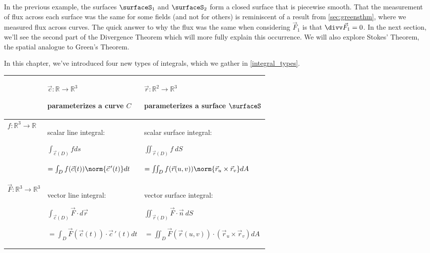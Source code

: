 In the previous example, the surfaces $\surfaceS_1$ and $\surfaceS_2$ form a closed surface that is piecewise smooth. That the measurement of flux across each surface was the same for some fields (and not for others) is reminiscent of a result from \autoref{sec:greensthm}, where we measured flux across curves. The quick answer to why the flux was the same when considering $\vec F_1$ is that $\divv \vec F_1 = 0$. In the next section, we'll see the second part of the Divergence Theorem which will more fully explain this occurrence. We will also explore Stokes' Theorem, the spatial analogue to Green's Theorem.\bigskip

In this chapter, we've introduced four new types of integrals, which we gather in \autoref{integral_types}.

\setboxwidth{80pt}
\begin{keyidea}\label{integral_types}
\renewcommand{\arraystretch}{1.4}
 \begin{tabular}{|l|p{.32\specialboxlength}|p{.43\specialboxlength}|}\hline
  & $\vec c:\mathbb{R}\to\mathbb{R}^3$\par parameterizes a curve $C$
  & $\vec r:\mathbb{R}^2\to\mathbb{R}^3$\par parameterizes a surface $\surfaceS$ \\\hline
  $f:\mathbb{R}^3\to\mathbb{R}$
  & scalar line integral:\par
  $\int_{\vec c(D)} f ds$\par
  \qquad$=\int_D f(\vec c(t))\norm{\vec c\,'(t)}dt$
  & scalar surface integral:\par
  $\iint_{\vec r(D)} f\ dS$\par
  \qquad$=\iint_D f(\vec r(u,v))\norm{\vec r_u\times\vec r_v}dA$
  \\\hline
  $\vec F:\mathbb{R}^3\to\mathbb{R}^3$
  & vector line integral:\par
  $\int_{\vec c(D)}\vec F\cdot d\vec r$\par
  \qquad$=\int_D\vec F(\vec c(t))\cdot\vec c\,'(t)dt$
  & vector surface integral:\par
  $\iint_{\vec r(D)}\vec F\cdot\vec n\ dS$\par
  \qquad$=\iint_D\vec F(\vec r(u,v))\cdot(\vec r_u\times\vec r_v)dA$
  \\\hline
 \end{tabular}
\end{keyidea}

